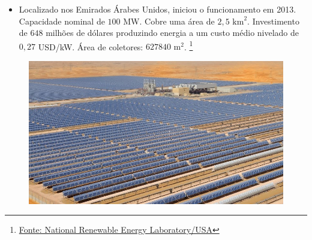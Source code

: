 \documentclass[12pt,notheorems,hyperref={pdfauthor= Rafael Nardi}]{beamer}
\begin{document}
\begin{frame}%

	\begin{itemize} 
		\item Localizado nos Emirados Árabes Unidos, iniciou o funcionamento em
			2013. Capacidade nominal de $100$ MW. Cobre uma área de $2,5$
			$\text{km}^2$. Investimento de $648$ milhões de dólares produzindo
			energia a um custo médio nivelado de $0,27$ USD/kW. Área de coletores:
			$627840$ $\text{m}^2$.  \footnote{\href{portal petronoticias.com.br}{Fonte: National Renewable Energy Laboratory/USA}}
	\end{itemize}

	\bigskip

	\begin{figure}[ht]
		\centering
		\includegraphics[scale=0.35]{./Shams_1.jpg}
	\end{figure}

\end{frame}
\end{document}
